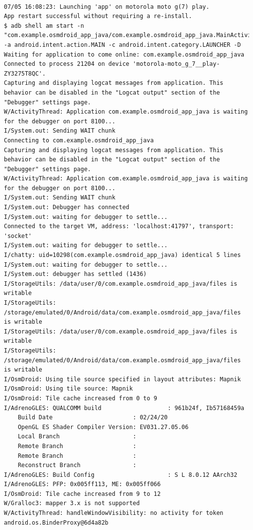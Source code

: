 \documentclass[a4paper,12pt]{book}
\begin{document}
\begin{lstlisting}

07/05 16:08:23: Launching 'app' on motorola moto g(7) play.
App restart successful without requiring a re-install.
$ adb shell am start -n "com.example.osmdroid_app_java/com.example.osmdroid_app_java.MainActivity" -a android.intent.action.MAIN -c android.intent.category.LAUNCHER -D
Waiting for application to come online: com.example.osmdroid_app_java
Connected to process 21204 on device 'motorola-moto_g_7__play-ZY3275T8QC'.
Capturing and displaying logcat messages from application. This behavior can be disabled in the "Logcat output" section of the "Debugger" settings page.
W/ActivityThread: Application com.example.osmdroid_app_java is waiting for the debugger on port 8100...
I/System.out: Sending WAIT chunk
Connecting to com.example.osmdroid_app_java
Capturing and displaying logcat messages from application. This behavior can be disabled in the "Logcat output" section of the "Debugger" settings page.
W/ActivityThread: Application com.example.osmdroid_app_java is waiting for the debugger on port 8100...
I/System.out: Sending WAIT chunk
I/System.out: Debugger has connected
I/System.out: waiting for debugger to settle...
Connected to the target VM, address: 'localhost:41797', transport: 'socket'
I/System.out: waiting for debugger to settle...
I/chatty: uid=10298(com.example.osmdroid_app_java) identical 5 lines
I/System.out: waiting for debugger to settle...
I/System.out: debugger has settled (1436)
I/StorageUtils: /data/user/0/com.example.osmdroid_app_java/files is writable
I/StorageUtils: /storage/emulated/0/Android/data/com.example.osmdroid_app_java/files is writable
I/StorageUtils: /data/user/0/com.example.osmdroid_app_java/files is writable
I/StorageUtils: /storage/emulated/0/Android/data/com.example.osmdroid_app_java/files is writable
I/OsmDroid: Using tile source specified in layout attributes: Mapnik
I/OsmDroid: Using tile source: Mapnik
I/OsmDroid: Tile cache increased from 0 to 9
I/AdrenoGLES: QUALCOMM build                   : 961b24f, Ib57168459a
    Build Date                       : 02/24/20
    OpenGL ES Shader Compiler Version: EV031.27.05.06
    Local Branch                     : 
    Remote Branch                    : 
    Remote Branch                    : 
    Reconstruct Branch               : 
I/AdrenoGLES: Build Config                     : S L 8.0.12 AArch32
I/AdrenoGLES: PFP: 0x005ff113, ME: 0x005ff066
I/OsmDroid: Tile cache increased from 9 to 12
W/Gralloc3: mapper 3.x is not supported
W/ActivityThread: handleWindowVisibility: no activity for token android.os.BinderProxy@6d4a82b

\end{lstlisting}
\end{document}
